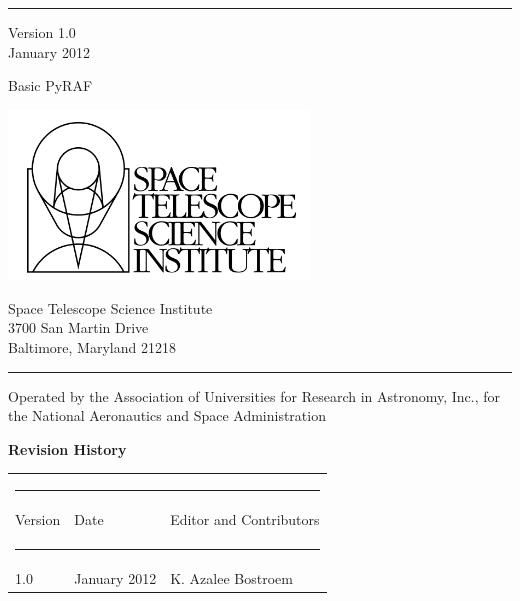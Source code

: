 \begin{titlepage}
\rule{165mm}{0.8mm}
 Version 1.0 \\
 January 2012

\vspace{30mm}
{\Huge Basic PyRAF }

\vspace{80mm}

\begin{minipage}[l]{80mm}
\includegraphics[width=8cm]{logo.jpg}

\end{minipage}
%
\hspace{5mm}
\begin{minipage}[u]{75mm}
\begin{flushright}
Space Telescope Science Institute \\
3700 San Martin Drive \\
Baltimore, Maryland 21218
\end{flushright}
\end{minipage}

\rule{165mm}{0.8mm}

{\scriptsize Operated by the Association of Universities for Research in Astronomy, Inc., for the National Aeronautics and Space Administration }
 
 \newpage
  \thispagestyle{empty}  
  
{\Large \bf Revision History}



\begin{table}[h]
\begin{tabular}{lll} 
\multicolumn{3}{c}{ \rule{130mm}{0.2mm}}      \\
Version  & Date & Editor and Contributors    {\rule [-3mm]{0mm}{8mm}  }\\ 
 \multicolumn{3}{c}{ \rule[2mm]{130mm}{0.8mm}}      \\
      1.0                 &  January 2012  &K. Azalee Bostroem \\ 
 

\end{tabular}
\end{table}
\end{titlepage}
